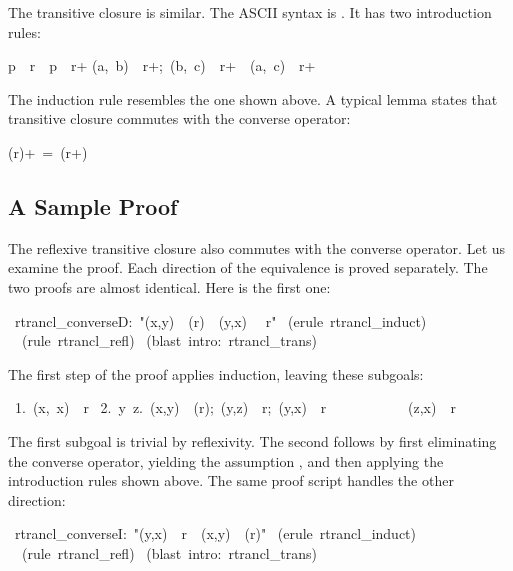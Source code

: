 \smallskip
The transitive closure is similar.  The ASCII syntax is
.  It has two  introduction rules: 
\begin{isabelle}
p\ \isasymin \ r\ \isasymLongrightarrow \ p\ \isasymin \ r\isactrlsup +
\isanewline
\isasymlbrakk (a,\ b)\ \isasymin \ r\isactrlsup +;\ (b,\ c)\ \isasymin \ r\isactrlsup +\isasymrbrakk \ \isasymLongrightarrow \ (a,\ c)\ \isasymin \ r\isactrlsup +
\end{isabelle}
%
The induction rule resembles the one shown above. 
A typical lemma states that transitive closure commutes with the converse
operator: 
\begin{isabelle}
(r\isasyminverse )\isactrlsup +\ =\ (r\isactrlsup +)\isasyminverse 
{}
\end{isabelle}

\subsection{A Sample Proof}

The reflexive transitive closure also commutes with the converse
operator.  Let us examine the proof. Each direction of the equivalence
is  proved separately. The two proofs are almost identical. Here 
is the first one: 
\begin{isabelle}
\ rtrancl_converseD:\ "(x,y)\ \isasymin \
(r\isasyminverse)\isactrlsup *\ \isasymLongrightarrow \ (y,x)\ \isasymin
\ r\isactrlsup *"\isanewline
{}\ (erule\ rtrancl_induct)\isanewline
\ \ (rule\ rtrancl_refl)\isanewline
\isacommand{apply}\ (blast\ intro:\ rtrancl_trans)\isanewline
{}
\end{isabelle}
%
The first step of the proof applies induction, leaving these subgoals: 
\begin{isabelle}
\ 1.\ (x,\ x)\ \isasymin \ r\isactrlsup *\isanewline
\ 2.\ \isasymAnd y\ z.\ \isasymlbrakk (x,y)\ \isasymin \
(r\isasyminverse)\isactrlsup *;\ (y,z)\ \isasymin \ r\isasyminverse ;\
(y,x)\ \isasymin \ r\isactrlsup *\isasymrbrakk \isanewline
\ \ \ \ \ \ \ \ \ \ \isasymLongrightarrow \ (z,x)\ \isasymin \ r\isactrlsup *
\end{isabelle}
%
The first subgoal is trivial by reflexivity. The second follows 
by first eliminating the converse operator, yielding the
assumption , and then
applying the introduction rules shown above.  The same proof script handles
the other direction: 
\begin{isabelle}
\isacommand{lemma}\ rtrancl_converseI:\ "(y,x)\ \isasymin \ r\isactrlsup *\ \isasymLongrightarrow \ (x,y)\ \isasymin \ (r\isasyminverse)\isactrlsup *"\isanewline
\isacommand{apply}\ (erule\ rtrancl_induct)\isanewline
\ \ (rule\ rtrancl_refl)\isanewline
\isacommand{apply}\ (blast\ intro:\ rtrancl_trans)\isanewline
\isacommand{done}
\end{isabelle}


